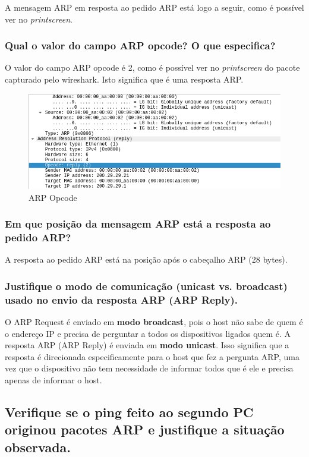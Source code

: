 A mensagem ARP em resposta ao pedido ARP está logo a seguir, como é possível ver no \textit{printscreen}.

\subsubsection{Qual o valor do campo ARP opcode? O que especifica?}

O valor do campo ARP opcode é 2, como é possível ver no \textit{printscreen} do pacote capturado pelo wireshark. Isto significa que é uma resposta ARP.

\begin{figure} [h]
    \centering
    \includegraphics[width=1\linewidth]{opcode-arp-reply.png}
    \caption{ARP Opcode}
    \label{fig:enter-label}
\end{figure}

\subsubsection{Em que posição da mensagem ARP está a resposta ao pedido ARP?}

A resposta ao pedido ARP está na posição após o cabeçalho ARP (28 bytes).

\subsubsection{Justifique o modo de comunicação (unicast vs. broadcast) usado no envio da resposta ARP (ARP Reply).}

O ARP Request é enviado em \textbf{modo broadcast}, pois o host não sabe de quem é o endereço IP e precisa de perguntar a todos os dispositivos ligados quem é. A resposta ARP (ARP Reply) é enviada em \textbf{modo unicast}. Isso significa que a resposta é direcionada especificamente para o host que fez a pergunta ARP, uma vez que o dispositivo não tem necessidade de informar todos que é ele e precisa apenas de informar o host.

\subsection{Verifique se o ping feito ao segundo PC originou pacotes ARP e justifique a situação observada.}

